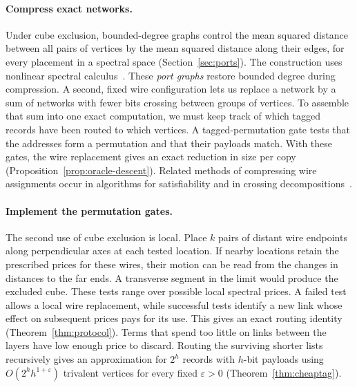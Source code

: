 \paragraph{Compress exact networks.}
Under cube exclusion, bounded-degree graphs control the mean squared
distance between all pairs of vertices by the mean squared distance
along their edges, for every placement in a spectral space
(Section~\ref{sec:ports}). The construction uses nonlinear spectral
calculus~\cite{MendelNaor,MendelNaorBarycentric,MendelNaorHadamard}.
These \emph{port graphs} restore bounded degree during compression.
A second, fixed wire configuration lets us replace a network by a sum
of networks with fewer bits crossing between groups of vertices.
To assemble that sum into one exact computation, we must keep track of
which tagged records have been routed to which vertices. A
tagged-permutation gate tests that the addresses form a permutation
and that their payloads match. With these gates, the wire replacement
gives an exact reduction in size per copy
(Proposition~\ref{prop:oracle-descent}). Related methods of compressing
wire assignments occur in algorithms for satisfiability
\cite[Appendix~D]{falseeth} and in crossing decompositions~\cite{Anthropic}.

\paragraph{Implement the permutation gates.}
The second use of cube exclusion is local. Place \(k\) pairs of distant
wire endpoints along perpendicular axes at each tested location. If
nearby locations retain the prescribed prices for these wires, their
motion can be read from the changes in distances to the far ends.
A transverse segment in the limit would produce the excluded cube.
These tests range over possible local spectral prices. A failed test
allows a local wire replacement, while
successful tests identify a new link whose effect on subsequent prices
pays for its use. This gives an exact routing identity
(Theorem~\ref{thm:protocol}). Terms that spend too little on links between the layers have low
enough price to discard. Routing the surviving shorter lists recursively gives an approximation for
\(2^h\) records with \(h\)-bit payloads using
\(O(2^h h^{1+\varepsilon})\) trivalent vertices for every fixed
\(\varepsilon>0\) (Theorem~\ref{thm:cheaptag}).


